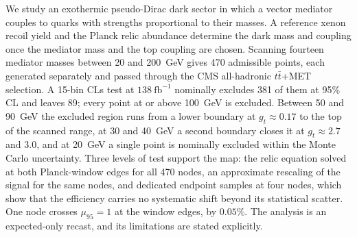 We study an exothermic pseudo-Dirac dark sector in which a vector mediator couples to quarks with strengths proportional to their masses. A reference xenon recoil yield and the Planck relic abundance determine the dark mass and coupling once the mediator mass and the top coupling are chosen. Scanning fourteen mediator masses between 20 and 200~GeV gives 470 admissible points, each generated separately and passed through the CMS all-hadronic $t\bar t$+MET selection. A 15-bin CLs test at $138\ \mathrm{fb}^{-1}$ nominally excludes 381 of them at 95\% CL and leaves 89; every point at or above 100~GeV is excluded. Between 50 and 90~GeV the excluded region runs from a lower boundary at $g_t\approx0.17$ to the top of the scanned range, at 30 and 40~GeV a second boundary closes it at $g_t\approx2.7$ and $3.0$, and at 20~GeV a single point is nominally excluded within the Monte Carlo uncertainty. Three levels of test support the map: the relic equation solved at both Planck-window edges for all 470 nodes, an approximate rescaling of the signal for the same nodes, and dedicated endpoint samples at four nodes, which show that the efficiency carries no systematic shift beyond its statistical scatter. One node crosses $\mu_{95}=1$ at the window edges, by $0.05\%$. The analysis is an expected-only recast, and its limitations are stated explicitly.
